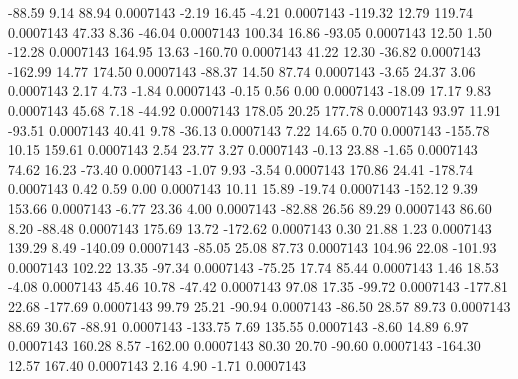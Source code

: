       -88.59        9.14       88.94     0.0007143
       -2.19       16.45       -4.21     0.0007143
     -119.32       12.79      119.74     0.0007143
       47.33        8.36      -46.04     0.0007143
      100.34       16.86      -93.05     0.0007143
       12.50        1.50      -12.28     0.0007143
      164.95       13.63     -160.70     0.0007143
       41.22       12.30      -36.82     0.0007143
     -162.99       14.77      174.50     0.0007143
      -88.37       14.50       87.74     0.0007143
       -3.65       24.37        3.06     0.0007143
        2.17        4.73       -1.84     0.0007143
       -0.15        0.56        0.00     0.0007143
      -18.09       17.17        9.83     0.0007143
       45.68        7.18      -44.92     0.0007143
      178.05       20.25      177.78     0.0007143
       93.97       11.91      -93.51     0.0007143
       40.41        9.78      -36.13     0.0007143
        7.22       14.65        0.70     0.0007143
     -155.78       10.15      159.61     0.0007143
        2.54       23.77        3.27     0.0007143
       -0.13       23.88       -1.65     0.0007143
       74.62       16.23      -73.40     0.0007143
       -1.07        9.93       -3.54     0.0007143
      170.86       24.41     -178.74     0.0007143
        0.42        0.59        0.00     0.0007143
       10.11       15.89      -19.74     0.0007143
     -152.12        9.39      153.66     0.0007143
       -6.77       23.36        4.00     0.0007143
      -82.88       26.56       89.29     0.0007143
       86.60        8.20      -88.48     0.0007143
      175.69       13.72     -172.62     0.0007143
        0.30       21.88        1.23     0.0007143
      139.29        8.49     -140.09     0.0007143
      -85.05       25.08       87.73     0.0007143
      104.96       22.08     -101.93     0.0007143
      102.22       13.35      -97.34     0.0007143
      -75.25       17.74       85.44     0.0007143
        1.46       18.53       -4.08     0.0007143
       45.46       10.78      -47.42     0.0007143
       97.08       17.35      -99.72     0.0007143
     -177.81       22.68     -177.69     0.0007143
       99.79       25.21      -90.94     0.0007143
      -86.50       28.57       89.73     0.0007143
       88.69       30.67      -88.91     0.0007143
     -133.75        7.69      135.55     0.0007143
       -8.60       14.89        6.97     0.0007143
      160.28        8.57     -162.00     0.0007143
       80.30       20.70      -90.60     0.0007143
     -164.30       12.57      167.40     0.0007143
        2.16        4.90       -1.71     0.0007143
